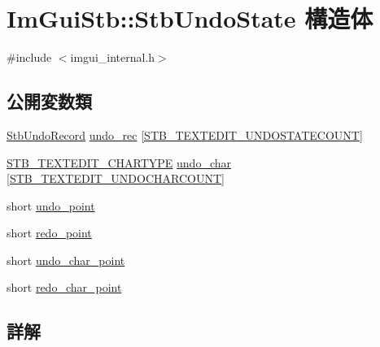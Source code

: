 \hypertarget{struct_im_gui_stb_1_1_stb_undo_state}{}\section{Im\+Gui\+Stb\+:\+:Stb\+Undo\+State 構造体}
\label{struct_im_gui_stb_1_1_stb_undo_state}


{\ttfamily \#include $<$imgui\+\_\+internal.\+h$>$}

\subsection*{公開変数類}
\begin{DoxyCompactItemize}
\item 
\mbox{\hyperlink{struct_im_gui_stb_1_1_stb_undo_record}{Stb\+Undo\+Record}} \mbox{\hyperlink{struct_im_gui_stb_1_1_stb_undo_state_a3cba4c0766038584aa310a52e763bbda}{undo\+\_\+rec}} \mbox{[}\mbox{\hyperlink{stb__textedit_8h_afa79483143df87a1497010712b3dfaf9}{S\+T\+B\+\_\+\+T\+E\+X\+T\+E\+D\+I\+T\+\_\+\+U\+N\+D\+O\+S\+T\+A\+T\+E\+C\+O\+U\+NT}}\mbox{]}
\item 
\mbox{\hyperlink{stb__textedit_8h_a6e64031a061922e3a48d88fd8623f4c3}{S\+T\+B\+\_\+\+T\+E\+X\+T\+E\+D\+I\+T\+\_\+\+C\+H\+A\+R\+T\+Y\+PE}} \mbox{\hyperlink{struct_im_gui_stb_1_1_stb_undo_state_ad0f20ff04903ecdf613b8ad083937bbd}{undo\+\_\+char}} \mbox{[}\mbox{\hyperlink{stb__textedit_8h_a15cbcac55cf92003c28c44734422756a}{S\+T\+B\+\_\+\+T\+E\+X\+T\+E\+D\+I\+T\+\_\+\+U\+N\+D\+O\+C\+H\+A\+R\+C\+O\+U\+NT}}\mbox{]}
\item 
short \mbox{\hyperlink{struct_im_gui_stb_1_1_stb_undo_state_a594ee4720e8280db9595f2d5419a279c}{undo\+\_\+point}}
\item 
short \mbox{\hyperlink{struct_im_gui_stb_1_1_stb_undo_state_a6562a15b41f003f411253fe34ca81612}{redo\+\_\+point}}
\item 
short \mbox{\hyperlink{struct_im_gui_stb_1_1_stb_undo_state_aab20994d092277b9d590d24ff7667bae}{undo\+\_\+char\+\_\+point}}
\item 
short \mbox{\hyperlink{struct_im_gui_stb_1_1_stb_undo_state_a78a5419b9c8278da078ed7acd2daac23}{redo\+\_\+char\+\_\+point}}
\end{DoxyCompactItemize}


\subsection{詳解}


